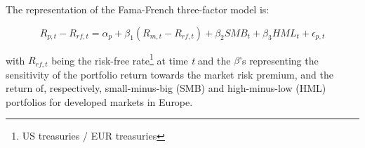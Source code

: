 The representation of the Fama-French three-factor model is:

\begin{equation} \label{eq: FF5}
    R_{p,t} - R_{rf,t} = \alpha_p + \beta_1(R_{m,t} - R_{rf,t}) + \beta_2 SMB_t + \beta_3 HML_t + \epsilon_{p,t} 
\end{equation}

with $R_{rf,t}$ being the risk-free rate\footnote{US treasuries / EUR treasuries} at time \textit{t} and the $\beta$'s representing the sensitivity of the portfolio return towards the market risk premium, and the return of, respectively, small-minus-big (SMB) and high-minus-low (HML) portfolios for developed markets in Europe.   
